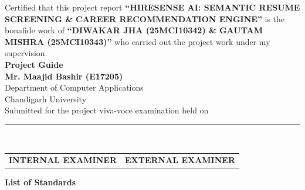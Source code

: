 \documentclass[12pt,a4paper]{report}
\begin{document}
\noindent Certified that this project report \textbf{``HIRESENSE AI: SEMANTIC RESUME SCREENING \& CAREER RECOMMENDATION ENGINE''} is the bonafide work of \textbf{``DIWAKAR JHA (25MCI10342) \& GAUTAM MISHRA (25MCI10343)''} who carried out the project work under my supervision.\\[2.5cm]

\noindent \textbf{Project Guide}\\[0.3cm]
\textbf{Mr. Maajid Bashir (E17205)}\\
Department of Computer Applications\\
Chandigarh University\\[2.5cm]

\noindent Submitted for the project viva-voce examination held on \rule{5cm}{0.4pt}\\[2.5cm]

\noindent \begin{tabular}{@{}p{}p{}@{}}
\textbf{INTERNAL EXAMINER} & \raggedleft \textbf{EXTERNAL EXAMINER}
\end{tabular}

\newpage
{}
\setcounter{page}{1}

\tableofcontents

\newpage
{}
\listoffigures

\newpage
{}
\listoftables

\newpage
{}
\begin{center}
    {\Large \textbf{List of Standards}}
\end{center}
\vspace{0.8cm}
\end{document}
